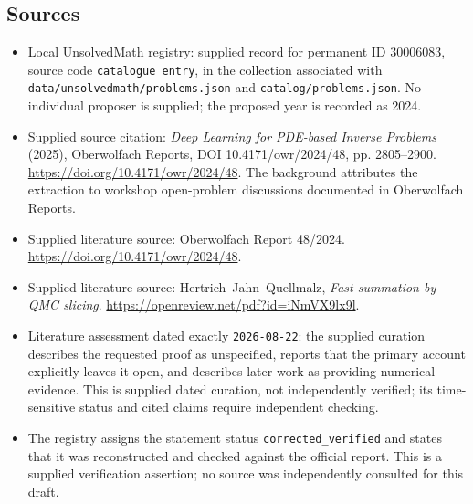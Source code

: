 \documentclass[11pt]{article}
\begin{document}
\subsection{Sources}
\begin{itemize}
\item Local UnsolvedMath registry: supplied record for permanent ID \(30006083\), source code \texttt{catalogue entry}, in the collection associated with \texttt{data/unsolvedmath/problems.json} and \texttt{catalog/problems.json}. No individual proposer is supplied; the proposed year is recorded as 2024.
\item Supplied source citation: \emph{Deep Learning for PDE-based Inverse Problems} (2025), Oberwolfach Reports, DOI 10.4171/owr/2024/48, pp. 2805--2900. \url{https://doi.org/10.4171/owr/2024/48}. The background attributes the extraction to workshop open-problem discussions documented in Oberwolfach Reports.
\item Supplied literature source: Oberwolfach Report 48/2024. \url{https://doi.org/10.4171/owr/2024/48}.
\item Supplied literature source: Hertrich--Jahn--Quellmalz, \emph{Fast summation by QMC slicing}. \url{https://openreview.net/pdf?id=iNmVX9lx9l}.
\item Literature assessment dated exactly \texttt{2026-08-22}: the supplied curation describes the requested proof as unspecified, reports that the primary account explicitly leaves it open, and describes later work as providing numerical evidence. This is supplied dated curation, not independently verified; its time-sensitive status and cited claims require independent checking.
\item The registry assigns the statement status \texttt{corrected\_verified} and states that it was reconstructed and checked against the official report. This is a supplied verification assertion; no source was independently consulted for this draft.
\end{itemize}
\end{document}

